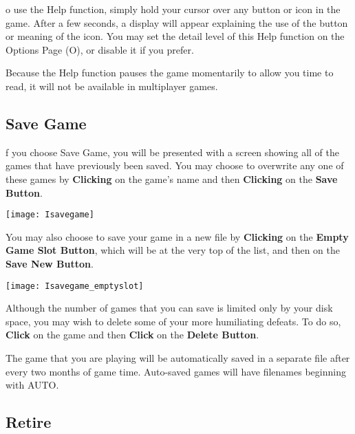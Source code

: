 o use the Help function, simply hold your cursor over any button or icon in the game. After a few seconds, a display will appear explaining the use of the button or meaning of the icon. You may set the detail level of this Help function on the Options Page (O), or disable it if you prefer.

Because the Help function pauses the game momentarily to allow you time to read, it will not be available in multiplayer games.

\subsection{\textsf{Save Game}}


f you choose Save Game, you will be presented with a screen showing all of the games that have previously been saved. You may choose to overwrite any one of these games by \textbf{Clicking} on the game’s name and then \textbf{Clicking} on the \textbf{Save Button}.

\begin{center}
    \texttt{[image: Isavegame]} %
\end{center}

You may also choose to save your game in a new file by \textbf{Clicking} on the \textbf{Empty Game Slot Button}, which will be at the very top of the list, and then on the \textbf{Save New Button}.

\begin{center}
    \texttt{[image: Isavegame\_emptyslot]} %
\end{center}

Although the number of games that you can save is limited only by your disk space, you may wish to delete some of your more humiliating defeats. To do so, \textbf{Click} on the game and then \textbf{Click} on the \textbf{Delete Button}.


The game that you are playing will be automatically saved in a separate file after every two months of game time. Auto-saved games will have filenames beginning with AUTO.

\subsection{\textsf{Retire}}

